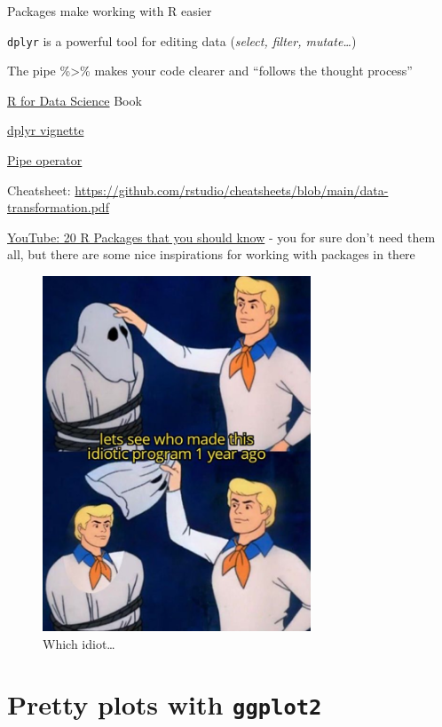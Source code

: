 \documentclass[
]{book}
\begin{document}
Packages make working with R easier

\texttt{dplyr} is a powerful tool for editing data (\emph{select, filter, mutate\ldots{}})

The pipe \%\textgreater\% makes your code clearer and ``follows the thought process''

\href{https://r4ds.hadley.nz/}{R for Data Science} Book

\href{https://dplyr.tidyverse.org/}{dplyr vignette}

\href{https://r4ds.hadley.nz/data-transform.html\#sec-the-pipe}{Pipe operator}

Cheatsheet: \url{https://github.com/rstudio/cheatsheets/blob/main/data-transformation.pdf}

\href{https://www.youtube.com/watch?v=npOf6aXdguY&ab_channel=RichardOnData}{YouTube: 20 R Packages that you should know} - you for sure don't need them all, but there are some nice inspirations for working with packages in there

\begin{figure}
\centering
\includegraphics[width=\textwidth,height=4.16667in]{./img/idiotic.png}
\caption{Which idiot\ldots{}}\label{id}
\end{figure}

\chapter{\texorpdfstring{Pretty plots with \texttt{ggplot2}}{Pretty plots with ggplot2}}\label{ggplot2}
\end{document}
